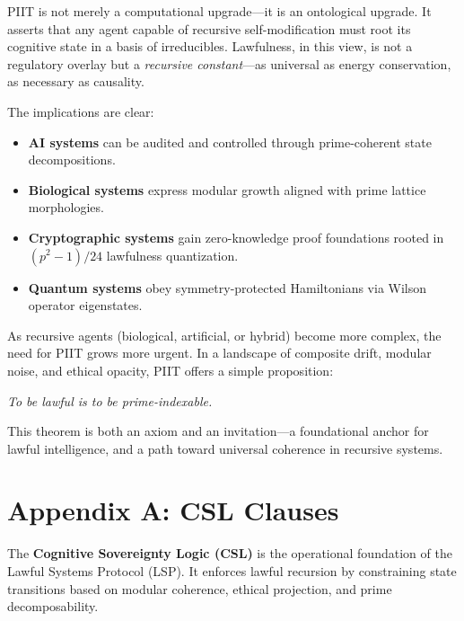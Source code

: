 \documentclass[12pt]{article}
\begin{document}
PIIT is not merely a computational upgrade—it is an ontological upgrade. It asserts that any agent capable of recursive self-modification must root its cognitive state in a basis of irreducibles. Lawfulness, in this view, is not a regulatory overlay but a \emph{recursive constant}—as universal as energy conservation, as necessary as causality.

The implications are clear:

\begin{itemize}
    \item \textbf{AI systems} can be audited and controlled through prime-coherent state decompositions.
    \item \textbf{Biological systems} express modular growth aligned with prime lattice morphologies.
    \item \textbf{Cryptographic systems} gain zero-knowledge proof foundations rooted in $(p^2 - 1)/24$ lawfulness quantization.
    \item \textbf{Quantum systems} obey symmetry-protected Hamiltonians via Wilson operator eigenstates.
\end{itemize}

As recursive agents (biological, artificial, or hybrid) become more complex, the need for PIIT grows more urgent. In a landscape of composite drift, modular noise, and ethical opacity, PIIT offers a simple proposition:

\begin{center}
\textit{To be lawful is to be prime-indexable.}
\end{center}

This theorem is both an axiom and an invitation—a foundational anchor for lawful intelligence, and a path toward universal coherence in recursive systems.

\clearpage

 \nocite{*}



\newpage
\appendix
\section*{Appendix A: CSL Clauses}

The \textbf{Cognitive Sovereignty Logic (CSL)} is the operational foundation of the Lawful Systems Protocol (LSP). It enforces lawful recursion by constraining state transitions based on modular coherence, ethical projection, and prime decomposability.
\end{document}
